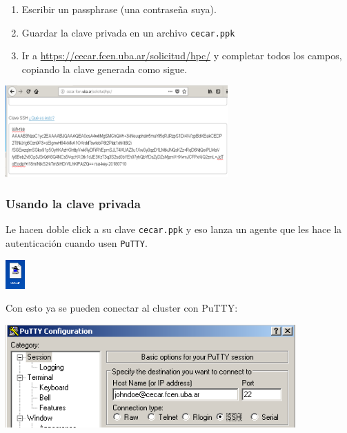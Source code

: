 \documentclass[]{beamer}
\begin{document}
\begin{frame}
\begin{enumerate}
  \item Escribir un passphrase (una contraseña suya).
  \item Guardar la clave privada en un archivo \Verb=cecar.ppk=
  \item Ir a \url{https://cecar.fcen.uba.ar/solicitud/hpc/} y completar todos los campos, copiando la clave generada como sigue.
\end{enumerate}
\begin{center}
  \includegraphics[width=23em]{./ssh-web-cecar}
  \end{center} 
\end{frame}

\begin{frame}
\frametitle{Usando la clave privada}
Le hacen doble click a su clave \Verb=cecar.ppk= y eso lanza un agente que les hace la autenticación cuando usen \Verb=PuTTY=.

\begin{center}
\includegraphics[width=2em]{cecarppk.png}
\end{center}

Con esto ya se pueden conectar al cluster con PuTTY:
\begin{center}
\includegraphics[width=30em]{putty-cfg.png}
\end{center}
\end{frame}
\end{document}
